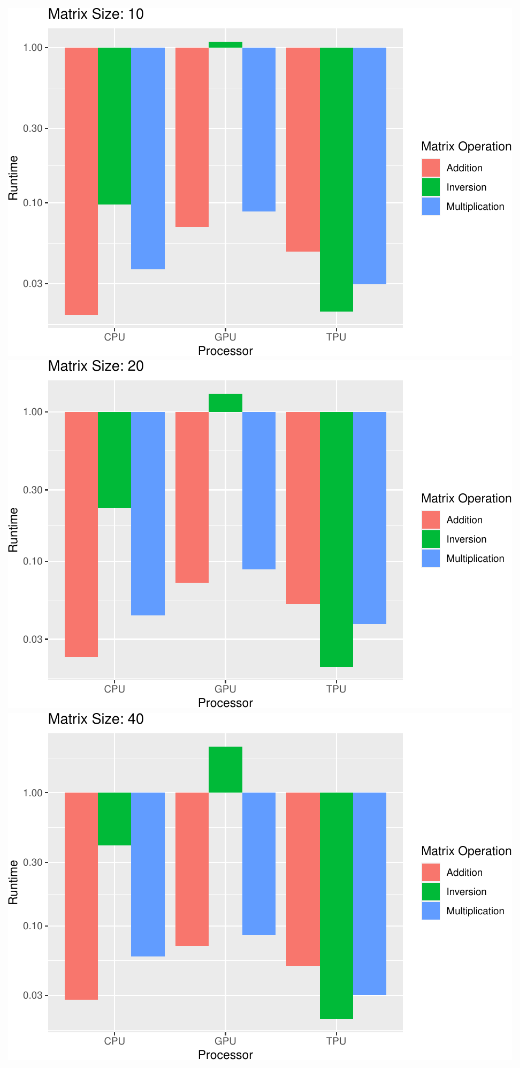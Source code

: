 \documentclass[
]{article}
\begin{document}
\includegraphics{main_files/figure-latex/unnamed-chunk-8-1.pdf}
\includegraphics{main_files/figure-latex/unnamed-chunk-8-2.pdf}
\includegraphics{main_files/figure-latex/unnamed-chunk-8-3.pdf}
\end{document}
